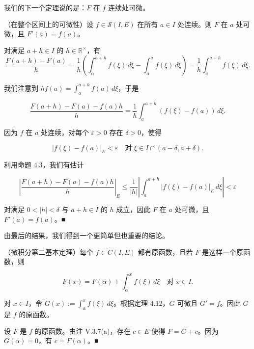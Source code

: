 我们的下一个定理说的是：$ F $ 在 $ f $ 连续处可微。

\begin{theorem}

（在整个区间上的可微性）设 $ f \in \mathcal{S}(I, E) $ 在所有 $ a \in I $ 处连续。则 $ F $ 在 $ a $ 处可微，且 $ F'(a) = f(a) $。

\proofhead
对满足 $ a + h \in I $ 的 $ h \in \mathbb{R}^{\times} $，有
\[
\frac{F(a + h) - F(a)}{h} = \frac{1}{h}\left( \int_{\alpha}^{a+h} f(\xi) \, d\xi - \int_{\alpha}^{a} f(\xi) \, d\xi \right) = \frac{1}{h}\int_{a}^{a+h} f(\xi) \, d\xi .
\]

我们注意到 $ hf(a) = \int_{a}^{a+h} f(a) \, d\xi $，于是

\[
\frac{F(a + h) - F(a) - f(a)h}{h} = \frac{1}{h}\int_{a}^{a+h} (f(\xi) - f(a)) \, d\xi .
\]

因为 $ f $ 在 $ a $ 处连续，对每个 $ \varepsilon > 0 $ 存在 $ \delta > 0 $，使得

\[
|f(\xi) - f(a)|_{E} < \varepsilon \quad \text{对 } \xi \in I \cap (a - \delta, a + \delta) .
\]

利用命题 4.3，我们有估计

\[
\left| \frac{F(a + h) - F(a) - f(a)h}{h} \right|_{E} \le \frac{1}{|h|}\left| \int_{a}^{a+h} |f(\xi) - f(a)|_{E} \, d\xi \right| < \varepsilon
\]

对满足 $ 0 < |h| < \delta $ 与 $ a + h \in I $ 的 $ h $ 成立，因此 $ F $ 在 $ a $ 处可微，且 $ F'(a) = f(a) $。\nobreak\hspace{0.35em}■

\end{theorem}

由最后的结果，我们得到一个更简单但也重要的结论。

\begin{theorem}

（微积分第二基本定理）每个 $ f \in C(I, E) $ 都有原函数，且若 $ F $ 是这样一个原函数，则

\[
F(x) = F(\alpha) + \int_{\alpha}^{x} f(\xi) \, d\xi \quad \text{对 } x \in I .
\]

\proofhead
对 $ x \in I $，令 $ G(x) := \int_{\alpha}^{x} f(\xi) \, d\xi $。根据定理 4.12，$ G $ 可微且 $ G' = f $。因此 $ G $ 是 $ f $ 的原函数。

设 $ F $ 是 $ f $ 的原函数。由注 V.3.7(a)，存在 $ c \in E $ 使得 $ F = G + c $。因为 $ G(\alpha) = 0 $，有 $ c = F(\alpha) $。\nobreak\hspace{0.35em}■
\end{theorem}


